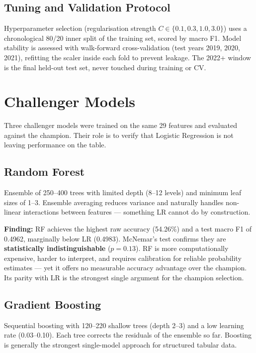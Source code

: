 \documentclass[12pt,a4paper,openany]{report}
\begin{document}
\section{Tuning and Validation Protocol}

Hyperparameter selection (regularisation strength $C \in \{0.1, 0.3, 1.0, 3.0\}$)
uses a chronological 80/20 inner split of the training set, scored by macro
F1. Model stability is assessed with walk-forward cross-validation (test years
2019, 2020, 2021), refitting the scaler inside each fold to prevent leakage.
The 2022+ window is the final held-out test set, never touched during training
or CV.

\chapter{Challenger Models}

Three challenger models were trained on the same 29 features and evaluated
against the champion. Their role is to verify that Logistic Regression is not
leaving performance on the table.

\section{Random Forest}

Ensemble of 250--400 trees with limited depth (8--12 levels) and minimum leaf
sizes of 1--3. Ensemble averaging reduces variance and naturally handles
non-linear interactions between features --- something LR cannot do by
construction.

\medskip
\textbf{Finding:} RF achieves the highest raw accuracy (54.26\%) and a test macro F1
of 0.4962, marginally below LR (0.4983). McNemar's test confirms they are
\textbf{statistically indistinguishable} ($p = 0.13$). RF is more computationally
expensive, harder to interpret, and requires calibration for reliable
probability estimates --- yet it offers no measurable accuracy advantage over the
champion. Its parity with LR is the strongest single argument for the champion
selection.

\section{Gradient Boosting}

Sequential boosting with 120--220 shallow trees (depth 2--3) and a low learning
rate (0.03--0.10). Each tree corrects the residuals of the ensemble so far.
Boosting is generally the strongest single-model approach for structured
tabular data.
\end{document}
